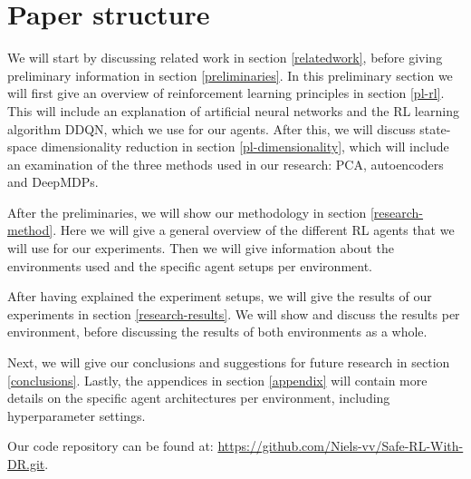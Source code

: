 \section{Paper structure}
We will start by discussing related work in section \ref{relatedwork}, before giving preliminary information in section \ref{preliminaries}. In this preliminary section we will first give an overview of reinforcement learning principles in section \ref{pl-rl}. This will include an explanation of artificial neural networks and the RL learning algorithm DDQN, which we use for our agents. After this, we will discuss state-space dimensionality reduction in section \ref{pl-dimensionality}, which will include an examination of the three methods used in our research: PCA, autoencoders and DeepMDPs.

After the preliminaries, we will show our methodology in section \ref{research-method}. Here we will give a general overview of the different RL agents that we will use for our experiments. Then we will give information about the environments used and the specific agent setups per environment. 

After having explained the experiment setups, we will give the results of our experiments in section \ref{research-results}. We will show and discuss the results per environment, before discussing the results of both environments as a whole.

Next, we will give our conclusions and suggestions for future research in section \ref{conclusions}. Lastly, the appendices in section \ref{appendix} will contain more details on the specific agent architectures per environment, including hyperparameter settings.

Our code repository can be found at: \url{https://github.com/Niels-vv/Safe-RL-With-DR.git}.